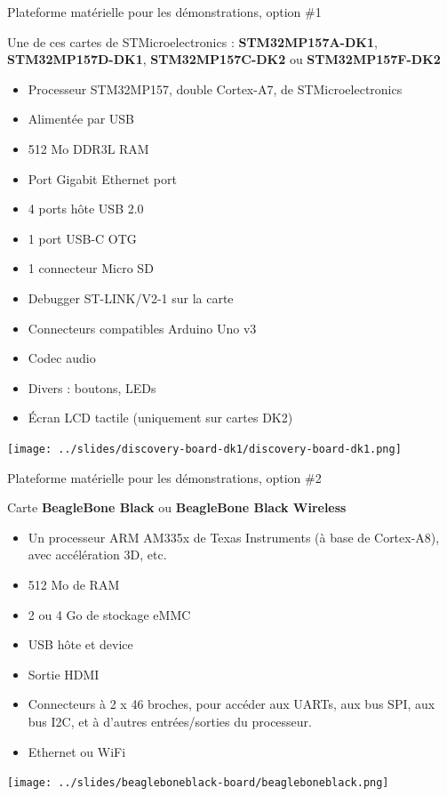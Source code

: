 \documentclass[a4paper,12pt,obeyspaces,spaces,hyphens]{article}
\begin{document}
\feshowtitle

\feshowinfo

\feagendatwocolumn
{Plateforme matérielle pour les démonstrations, option \#1}
{
  Une de ces cartes de STMicroelectronics : {\bf
  STM32MP157A-DK1}, {\bf STM32MP157D-DK1}, {\bf STM32MP157C-DK2} ou
  {\bf STM32MP157F-DK2}
  \begin{itemize}
  \item Processeur STM32MP157, double Cortex-A7, de STMicroelectronics
  \item Alimentée par USB
  \item 512 Mo DDR3L RAM
  \item Port Gigabit Ethernet port
  \item 4 ports hôte USB 2.0
  \item 1 port USB-C OTG
  \item 1 connecteur Micro SD
  \item Debugger ST-LINK/V2-1 sur la carte
  \item Connecteurs compatibles Arduino Uno v3
  \item Codec audio
  \item Divers : boutons, LEDs
  \item Écran LCD tactile (uniquement sur cartes DK2)
  \end{itemize}
}
{}
{
  \begin{center}
    \texttt{[image: ../slides/discovery-board-dk1/discovery-board-dk1.png]}
  \end{center}
}

\feagendatwocolumn
{Plateforme matérielle pour les démonstrations, option \#2}
{
  Carte {\bf BeagleBone Black} ou {\bf BeagleBone Black Wireless}
  \begin{itemize}
  \item Un processeur ARM AM335x de Texas Instruments (à base de
    Cortex-A8), avec accélération 3D, etc.
  \item 512 Mo de RAM
  \item 2 ou 4 Go de stockage eMMC
  \item USB hôte et device
  \item Sortie HDMI
  \item Connecteurs à 2 x 46 broches, pour accéder aux UARTs, aux bus
    SPI, aux bus I2C, et à d'autres entrées/sorties du processeur.
  \item Ethernet ou WiFi
  \end{itemize}
}
{}
{
  \begin{center}
    \texttt{[image: ../slides/beagleboneblack-board/beagleboneblack.png]}
  \end{center}
}
\end{document}
